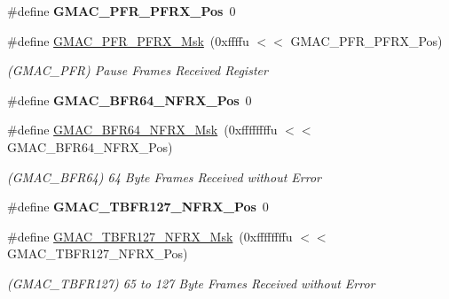 \begin{DoxyCompactItemize}
\mbox{\label{group__SAMV71__GMAC_ga5e83e810adf1f92d04daebc5774be903}} 
\#define {\bfseries G\+M\+A\+C\+\_\+\+P\+F\+R\+\_\+\+P\+F\+R\+X\+\_\+\+Pos}~0
\item 
\mbox{\label{group__SAMV71__GMAC_gaa230054cca5b54f2c481aee54a571f98}} 
\#define \mbox{\hyperlink{group__SAMV71__GMAC_gaa230054cca5b54f2c481aee54a571f98}{G\+M\+A\+C\+\_\+\+P\+F\+R\+\_\+\+P\+F\+R\+X\+\_\+\+Msk}}~(0xffffu $<$$<$ G\+M\+A\+C\+\_\+\+P\+F\+R\+\_\+\+P\+F\+R\+X\+\_\+\+Pos)
\begin{DoxyCompactList}\small\item\em (G\+M\+A\+C\+\_\+\+P\+FR) Pause Frames Received Register \end{DoxyCompactList}\item 
\mbox{\label{group__SAMV71__GMAC_gae4db36638bcf6a735bbc2c7b865da4d5}} 
\#define {\bfseries G\+M\+A\+C\+\_\+\+B\+F\+R64\+\_\+\+N\+F\+R\+X\+\_\+\+Pos}~0
\item 
\mbox{\label{group__SAMV71__GMAC_gaa85bccb4358df59109c4a0f99f9ed190}} 
\#define \mbox{\hyperlink{group__SAMV71__GMAC_gaa85bccb4358df59109c4a0f99f9ed190}{G\+M\+A\+C\+\_\+\+B\+F\+R64\+\_\+\+N\+F\+R\+X\+\_\+\+Msk}}~(0xffffffffu $<$$<$ G\+M\+A\+C\+\_\+\+B\+F\+R64\+\_\+\+N\+F\+R\+X\+\_\+\+Pos)
\begin{DoxyCompactList}\small\item\em (G\+M\+A\+C\+\_\+\+B\+F\+R64) 64 Byte Frames Received without Error \end{DoxyCompactList}\item 
\mbox{\label{group__SAMV71__GMAC_ga57d22d8b5074b683c214e81ad627b90c}} 
\#define {\bfseries G\+M\+A\+C\+\_\+\+T\+B\+F\+R127\+\_\+\+N\+F\+R\+X\+\_\+\+Pos}~0
\item 
\mbox{\label{group__SAMV71__GMAC_ga8b2049b16d4a7e162e20c27c0d621f72}} 
\#define \mbox{\hyperlink{group__SAMV71__GMAC_ga8b2049b16d4a7e162e20c27c0d621f72}{G\+M\+A\+C\+\_\+\+T\+B\+F\+R127\+\_\+\+N\+F\+R\+X\+\_\+\+Msk}}~(0xffffffffu $<$$<$ G\+M\+A\+C\+\_\+\+T\+B\+F\+R127\+\_\+\+N\+F\+R\+X\+\_\+\+Pos)
\begin{DoxyCompactList}\small\item\em (G\+M\+A\+C\+\_\+\+T\+B\+F\+R127) 65 to 127 Byte Frames Received without Error \end{DoxyCompactList}\item 
$$
\end{DoxyCompactItemize}
